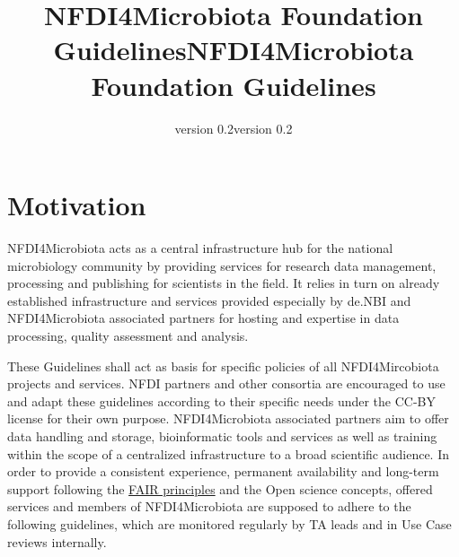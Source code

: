 \documentclass[
  paper=a4,
  ,captions=tableheading
]{scrartcl}
\title{NFDI4Microbiota Foundation Guidelines}
\author{}
\date{version 0.2}
\title{NFDI4Microbiota Foundation Guidelines}
\author{}
\date{version 0.2}
\begin{document}
      \begin{titlepage}
    
    \newcommand{\colorRule}[3][black]{\textcolor[HTML]{#1}{\rule{#2}{#3}}}
    \end{titlepage}
    \restoregeometry



{
\setcounter{tocdepth}{3}
\tableofcontents
\newpage
}
\hypertarget{motivation}{%
\section*{Motivation}\label{motivation}}

NFDI4Microbiota acts as a central infrastructure hub for the national
microbiology community by providing services for research data
management, processing and publishing for scientists in the field. It
relies in turn on already established infrastructure and services
provided especially by de.NBI and NFDI4Microbiota associated partners
for hosting and expertise in data processing, quality assessment and
analysis.

These Guidelines shall act as basis for specific policies of all
NFDI4Mircobiota projects and services. NFDI partners and other consortia
are encouraged to use and adapt these guidelines according to their
specific needs under the CC-BY license for their own purpose.
NFDI4Microbiota associated partners aim to offer data handling and
storage, bioinformatic tools and services as well as training within the
scope of a centralized infrastructure to a broad scientific audience. In
order to provide a consistent experience, permanent availability and
long-term support following the
\href{https://www.go-fair.org/fair-principles/}{FAIR principles} and the
Open science concepts, offered services and members of NFDI4Microbiota
are supposed to adhere to the following guidelines, which are monitored
regularly by TA leads and in Use Case reviews internally.
\end{document}
